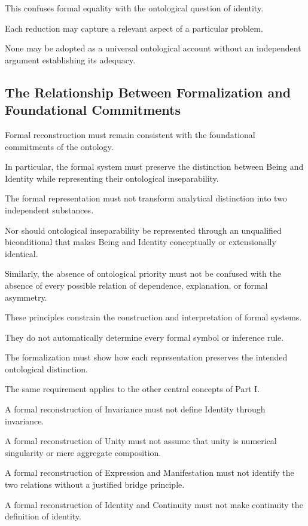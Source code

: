 This confuses
formal equality
with the
ontological question
of identity.

Each reduction
may capture
a relevant
aspect of
a particular
problem.

None may
be adopted
as a universal
ontological account
without an
independent argument
establishing its
adequacy.

\subsection{The Relationship Between Formalization and Foundational Commitments}

Formal reconstruction
must remain consistent
with the foundational
commitments of
the ontology.

In particular,
the formal system
must preserve
the distinction
between Being
and Identity
while representing
their ontological
inseparability.

The formal
representation must
not transform
analytical distinction
into two
independent substances.

Nor should
ontological inseparability
be represented
through an
unqualified biconditional
that makes
Being and
Identity conceptually
or extensionally
identical.

Similarly, the
absence of
ontological priority
must not
be confused
with the
absence of
every possible
relation of
dependence, explanation,
or formal
asymmetry.

These principles
constrain the
construction and
interpretation of
formal systems.

They do not
automatically determine
every formal
symbol or
inference rule.

The formalization
must show
how each
representation preserves
the intended
ontological distinction.

The same
requirement applies
to the
other central
concepts of
Part I.

A formal
reconstruction of
Invariance must
not define
Identity through
invariance.

A formal
reconstruction of
Unity must
not assume
that unity
is numerical
singularity or
mere aggregate
composition.

A formal
reconstruction of
Expression and
Manifestation must
not identify
the two
relations without
a justified
bridge principle.

A formal
reconstruction of
Identity and
Continuity must
not make
continuity the
definition of
identity.

